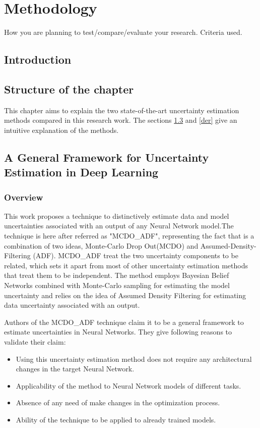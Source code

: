 

    \chapter{Methodology}

    How you are planning to test/compare/evaluate your research.
    Criteria used.

    \section{Introduction}

    \section{Structure of the chapter}
    This chapter aims to explain the two state-of-the-art uncertainty estimation methods compared in this research work. The sections \ref{general_framework} and \ref{der} give an intuitive explanation of the methods.
    
    \section{A General Framework for Uncertainty Estimation in Deep Learning}\label{general_framework}
    \subsection{Overview}
    This work proposes a technique to distinctively estimate data and model uncertainties associated with an output of any Neural Network model.The technique is here after referred as "MCDO\_ADF", representing the fact that is a combination of two ideas, Monte-Carlo Drop Out(MCDO) and Assumed-Density-Filtering (ADF). MCDO\_ADF treat the  two uncertainty components to be related, which sets it apart from most of other uncertainty estimation methods that treat them to be independent. The method employs Bayesian Belief Networks combined with Monte-Carlo sampling for estimating the model uncertainty and relies on the idea of Assumed Density Filtering for  estimating data uncertainty associated with an output. 
    
    Authors of the MCDO\_ADF technique claim it to be a general framework to estimate uncertainties in Neural Networks. They give following reasons to validate their claim:
    \begin{itemize}
    	\item Using this uncertainty estimation method does not require any architectural changes in the target Neural Network.
    	\item Applicability of the method to Neural Network models of different tasks.
    	\item Absence of any need of make changes in the optimization process.
    	\item Ability of the technique to be applied to already trained models.
    \end{itemize}
	
